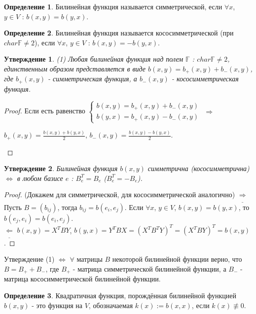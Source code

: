 \documentclass[a4paper, 12pt]{article}
\newcommand{\F}{\mathbb F}
\theoremstyle{definition}
\newtheorem*{definition}{Определение}
\theoremstyle{plain}
\newtheorem*{subtheorem}{Утверждение}
\theoremstyle{remark}
\begin{document}
  \newpage
  \begin{definition}
    Билинейная функция называется симметрической, если $\forall x$, $y\in V$ : $b(x, y)=b(y,x)$.
  \end{definition}
  \begin{definition}
    Билинейная функция называется кососимметрической (при $char\F\neq2$), если $\forall x$, $y\in V$ : $b(x,y)= -b(y,x)$.
  \end{definition}
  \begin{subtheorem}(1)
    Любая билинейная функция над полем $\F$ : $char\F\neq2$, единственным образом представляется в виде $b(x,y) = b_+(x,y)+b_-(x,y)$, где $b_+(x,y)$ - симметрическая функция, а $b_-(x,y)$ - кососимметрическая функция. 
  \end{subtheorem}
  \begin{proof}
    Если есть равенство $\begin{cases}
      b(x,y) = b_+(x,y)+b_-(x,y)\\
      b(y,x) = b_+(x,y)-b_-(x,y)
    \end{cases}$ $\Longrightarrow$\\
    \begin{center}
      $b_+(x,y) = \frac{b(x,y)+b(y,x)}{2}$, $b_-(x,y) = \frac{b(x,y)-b(y,x)}{2}$.
    \end{center}
  \end{proof}
  \begin{subtheorem}
    Билинейная функция $b(x,y)$ симметрична (кососимметрична)$\Longleftrightarrow$ в любом базисе $e$ : $B_e^T=B_e$ ($B_e^T=-B_e$).
  \end{subtheorem}
  \begin{proof} (Докажем для симметрической, для кососимметрической аналогично)
    $\underline{\Longrightarrow}$ Пусть $B = (b_{ij})$, тогда $b_{ij}=b(e_i, e_j)$. Если $\forall x$, $y\in V$, $b(x,y)= b(y,x)$, то $b(e_j, e_i) = b(e_i, e_j)$.\\
    $\underline{\Longleftarrow}$ $b(x,y)= X^TBY$, $b(y,x) = Y^TBX = (X^TB^TY)^T = (X^TBY)^T = b(x,y)$.
  \end{proof}
  Утверждение (1) $\Longleftrightarrow$ $\forall$ матрицы $B$ некоторой билинейной функции верно, что $B = B_++B_-$, где $B_+$ - матрица симметрической билинейной функции, а $B_-$ - матрица кососимметрической билинейной функции.
  \begin{definition}
    Квадратичная функция, порождённая билинейной функцией $b(x,y)$ - это функция на $V$, обозначаемая $k(x):=b(x,x)$, если $k(x)\not\equiv0$.
  \end{definition}
\end{document}
